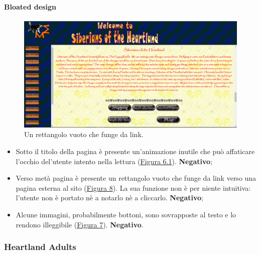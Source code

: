 \documentclass[../rapporto-usabilita.tex]{subfiles}
\begin{document}
	 	\paragraph{Bloated design}
	 	
	 	\begin{figure}[!h]
			\centering
				\includegraphics[scale=0.33]{immagini/nursery3.png}
				\caption{Un rettangolo vuoto che funge da link.}
				\label{fig:nursery3}
			\end{figure}	
	 	
	 	\begin{itemize}
	 		\item Sotto il titolo della pagina è presente un'animazione inutile che può affaticare l'occhio del'utente intento nella lettura (\hyperref[fig:nursery1]{Figura 6.1}).  \textbf{Negativo};
	 		
	 		\item Verso metà pagina è presente un rettangolo vuoto che funge da link verso una pagina esterna al sito (\hyperref[fig:nursery3]{Figura 8}). La sua funzione non è per niente intuitiva: l'utente non è portato nè a notarlo nè a cliccarlo. \textbf{Negativo};
	 		
	 		\item Alcune immagini, probabilmente bottoni, sono sovrapposte al testo e lo rendono illeggibile (\hyperref[fig:nursery4]{Figura 7}). \textbf{Negativo}.
	 		
	 	\end{itemize}
			
	\newpage			
			
	\subsubsection{Heartland Adults}
	
\end{document}
